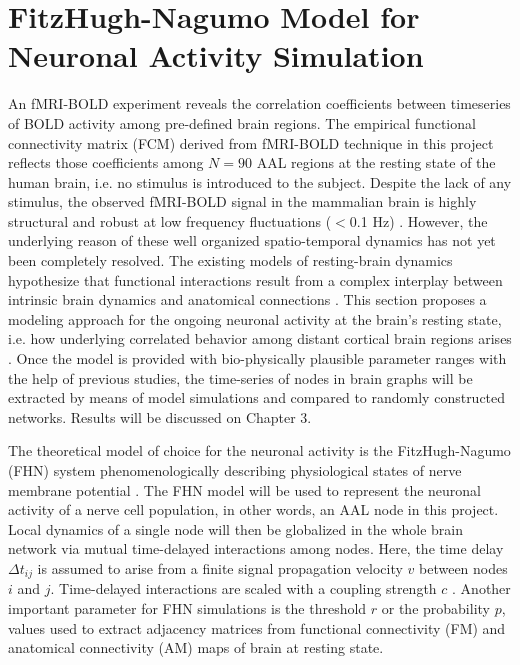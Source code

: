 \section{FitzHugh-Nagumo Model for Neuronal Activity Simulation}

An fMRI-BOLD experiment reveals the correlation coefficients between timeseries of BOLD activity among pre-defined brain regions. The empirical functional connectivity matrix (FCM) derived from fMRI-BOLD technique in this project reflects those coefficients among $N=90$ AAL regions at the resting state of the human brain, i.e. no stimulus is introduced to the subject. Despite the lack of any stimulus, the observed fMRI-BOLD signal in the mammalian brain is highly structural and robust at low frequency fluctuations ($<$0.1 Hz) \citep{BIS95, DAM06, VIN07a}. However, the underlying reason of these well organized spatio-temporal dynamics has not yet been completely resolved. The existing models of resting-brain dynamics hypothesize that functional interactions result from a complex interplay between intrinsic brain dynamics and anatomical connections \citep{RUB09}. This section proposes a modeling approach for the ongoing neuronal activity at the brain's resting state, i.e. how  underlying correlated behavior among distant cortical brain regions arises \citep{VUK13}. Once the model is provided with bio-physically plausible parameter ranges with the help of previous studies, the time-series of nodes in brain graphs will be extracted by means of model simulations and compared to randomly constructed networks. Results will be discussed on Chapter 3.

The theoretical model of choice for the neuronal activity is the FitzHugh-Nagumo (FHN) system phenomenologically describing physiological states of nerve membrane potential \citep{FIT61, NAG62}. The FHN model will be used to represent the neuronal activity of a nerve cell population, in other words, an AAL node in this project. Local dynamics of a single node will then be globalized in the whole brain network via mutual time-delayed interactions among nodes. Here, the time delay $\Delta t_{ij}$ is assumed to arise from a finite signal propagation velocity $v$ between nodes $i$ and $j$. Time-delayed interactions are scaled with a coupling strength $c$ \citep{GHO08, GHO08a, DEC09}. Another important parameter for FHN simulations is the threshold $r$ or the probability $p$, values used to extract adjacency matrices from functional connectivity (FM) and anatomical connectivity (AM) maps of brain at resting state. 

